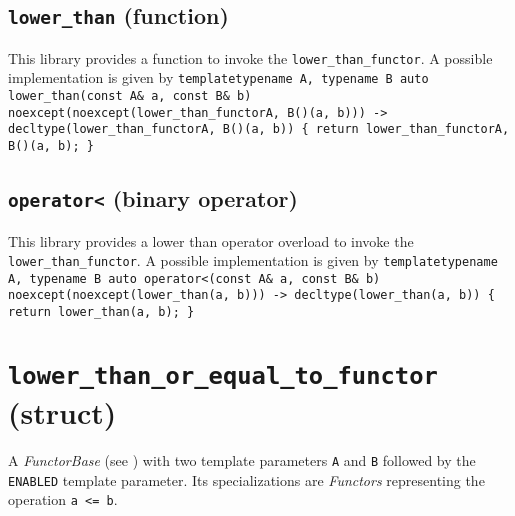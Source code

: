 \documentclass[oneside]{book}
\begin{document}
\subsection{\texttt{lower\_than} (function)}
This library provides a function to invoke the \texttt{lower\_than\_functor}.
A possible implementation is given by\newline
\texttt{template\textlangle typename A, typename B\textrangle\newline
auto\newline
lower\_than(const A\& a, const B\& b)\newline
noexcept(noexcept(lower\_than\_functor\textlangle A, B\textrangle()(a, b)))\newline
-> decltype(lower\_than\_functor\textlangle A, B\textrangle()(a, b))\newline
\{ return lower\_than\_functor\textlangle A, B\textrangle()(a, b); \}}

\subsection{\texttt{operator<} (binary operator)}
This library provides a lower than operator overload to invoke the \texttt{lower\_than\_functor}.
A possible implementation is given by\newline
\texttt{template\textlangle typename A, typename B\textrangle\newline
auto\newline
operator<(const A\& a, const B\& b)\newline
noexcept(noexcept(lower\_than(a, b)))\newline
-> decltype(lower\_than(a, b))\newline
\{ return lower\_than(a, b); \}}

\section{\texttt{lower\_than\_or\_equal\_to\_functor} (struct)}
A \textit{FunctorBase} (see \cite{functors}) with two template parameters \texttt{A} and \texttt{B} followed by the \texttt{ENABLED} template parameter.
Its specializations are \textit{Functors} representing the operation \texttt{a <= b}.
\end{document}
